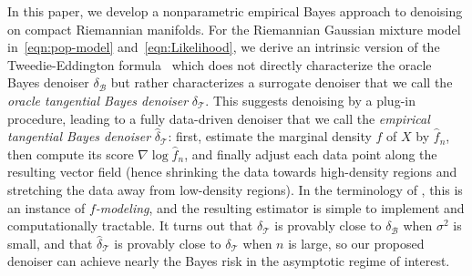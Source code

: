 \documentclass[preprint]{imsart}
\theoremstyle{plain}
\theoremstyle{definition}
\newcommand{\B}{\mathcal{B}}
\newcommand{\T}{\mathcal{T}}
\begin{document}
    In this paper, we develop a nonparametric empirical Bayes approach to denoising on compact Riemannian manifolds.
    For the Riemannian Gaussian mixture model in~\eqref{eqn:pop-model} and~\eqref{eqn:Likelihood}, we derive an intrinsic version of the Tweedie-Eddington formula~\cite{dyson1926method, Robbins1956, IgnatiadisSen} which does not directly characterize the oracle Bayes denoiser $\delta_{\B}$ but rather characterizes a surrogate denoiser that we call the \emph{oracle tangential Bayes denoiser} $\delta_\T$.
    This suggests denoising by a plug-in procedure, leading to a fully data-driven denoiser that we call the \textit{empirical tangential Bayes denoiser} $\hat{\delta}_{\T}$: first, estimate the marginal density $f$ of $X$ by $\hat f_n$, then compute its score $\nabla \log \hat f_n$, and finally adjust each data point along the resulting vector field (hence shrinking the data towards high-density regions and stretching the data away from low-density regions).
    In the terminology of \cite{Efron2014,efron2019bayes}, this is an instance of \textit{$f$-modeling}, and the resulting estimator is simple to implement and computationally tractable.
    It turns out that $\delta_{\T}$ is provably close to $\delta_{\B}$ when $\sigma^2$ is small, and that $\hat{\delta}_{\T}$ is provably close to $\delta_{\T}$ when $n$ is large, so our proposed denoiser can achieve nearly the Bayes risk in the asymptotic regime of interest.
\end{document}
